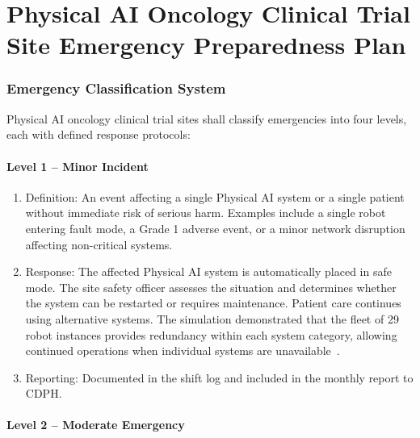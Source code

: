 

\part{Physical AI Oncology Clinical Trial Site Emergency Preparedness Plan}
\setcounter{section}{0}

\section{Emergency Classification System}

Physical AI oncology clinical trial sites shall classify emergencies into four
levels, each with defined response protocols:

\subsection{Level 1 -- Minor Incident}

\begin{enumerate}[label=(\alph*)]
\item Definition: An event affecting a single Physical AI system or a single
  patient without immediate risk of serious harm. Examples include a single
  robot entering fault mode, a Grade 1 adverse event, or a minor network
  disruption affecting non-critical systems.

\item Response: The affected Physical AI system is automatically placed in safe
  mode. The site safety officer assesses the situation and determines whether
  the system can be restarted or requires maintenance. Patient care continues
  using alternative systems. The simulation demonstrated that the fleet of 29
  robot instances provides redundancy within each system category, allowing
  continued operations when individual systems are
  unavailable~\cite{newtrial2026}.

\item Reporting: Documented in the shift log and included in the monthly report
  to CDPH.
\end{enumerate}

\subsection{Level 2 -- Moderate Emergency}

